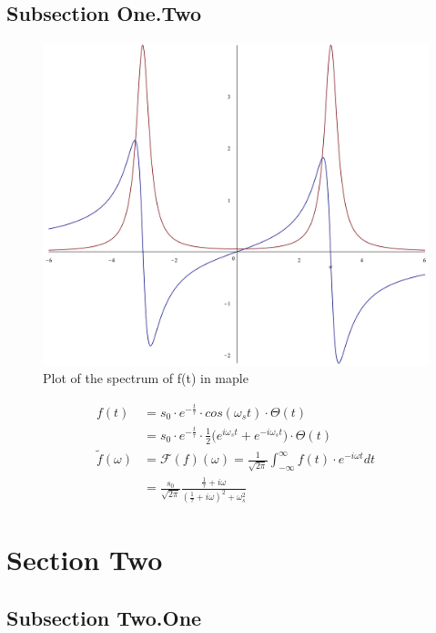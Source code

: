 \subsection{Subsection One.Two}
\lipsum[6]
\begin{figure}[h]
  \centering
  \includegraphics[width=\linewidth]{img/spectrum}
  \caption{Plot of the spectrum of f(t) in maple}
  \label{img:spectrum}
\end{figure}

\begin{align}
    f(t) &= s_0 \cdot e^{-\frac{t}{\tau}} \cdot cos(\omega_s t) \cdot \Theta(t) \nonumber \\
    &= s_0 \cdot e^{-\frac{t}{\tau}} \cdot \frac{1}{2} \Big( e^{i \omega_s t} + e^{-i \omega_s t} \Big) \cdot \Theta(t)\\
    \tilde{f}(\omega) &= \mathcal{F}(f)(\omega) = \frac{1}{\sqrt{2\pi}} \int_{-\infty}^{\infty} f(t) \cdot e^{-i \omega t} dt \nonumber\\
    &= \frac{s_0}{\sqrt{2\pi}} \frac{\frac{1}{\tau} + i \omega}{(\frac{1}{\tau} + i \omega)^2 + \omega_s^2}
\end{align}

\section{Section Two}
\lipsum[9-12]

\subsection{Subsection Two.One}
\lipsum[13-14]
